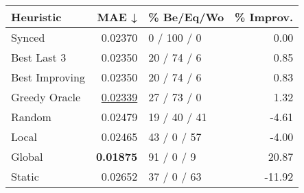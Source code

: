 \begin{tabular}{lrlr}
\toprule
\textbf{Heuristic} & \textbf{MAE ↓} & \textbf{\% Be/Eq/Wo} & \textbf{\% Improv.} \\
\midrule
            Synced &        0.02370 &          0 / 100 / 0 &                0.00 \\
\midrule
       Best Last 3 &        0.02350 &          20 / 74 / 6 &                0.85 \\
    Best Improving &        0.02350 &          20 / 74 / 6 &                0.83 \\
\addlinespace
     Greedy Oracle &        \underline{0.02339} &          27 / 73 / 0 &                1.32 \\
            Random &        0.02479 &         19 / 40 / 41 &               -4.61 \\
\midrule
             Local &        0.02465 &          43 / 0 / 57 &               -4.00 \\
            Global &        \textbf{0.01875} &           91 / 0 / 9 &               20.87 \\
\midrule
            Static &        0.02652 &          37 / 0 / 63 &              -11.92 \\
\bottomrule
\end{tabular}

\label{tab:iid_lr05_le1_bs4_Summary}
